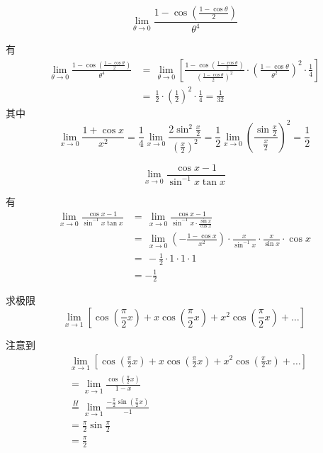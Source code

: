 \begin{questions}
    \question 
    \[
    \lim_{\theta \to 0} \frac{1 - \cos\left(\frac{1 - \cos \theta}{2}\right)}{\theta^4}
    \]
    \begin{solution}
        有
        \begin{align*}
        \lim_{\theta \to 0} \frac{1 - \cos\left(\frac{1 - \cos \theta}{2}\right)}{\theta^4} 
        &=\,\lim_{\theta \to 0} \left[
        \frac{1 - \cos\left(\frac{1 - \cos \theta}{2}\right)}{\left( \frac{1 - \cos \theta}{2} \right)^2}
        \cdot \left( \frac{1 - \cos \theta}{\theta^2} \right)^2 \cdot \frac{1}{4}
        \right] \\
        &=\,\frac{1}{2} \cdot \left(\frac{1}{2}\right)^2 \cdot \frac{1}{4} = \frac{1}{32}
        \end{align*}
        其中 \[
        \lim_{x \to 0} \frac{1+\cos x}{x^2}= \frac14\lim_{x \to 0}\frac{2\sin^2 \frac{x}{2} }{(\frac{x}{2})^2}=\frac12 \lim_{x \to 0} \left(\frac{\sin \frac{x}{2}}{\frac{x}{2}}\right)^2=\frac12
        \]
    \end{solution}
        
    \question 
    \[
    \lim_{x \to 0} \frac{\cos x - 1}{\sin^{-1} x \tan x}
    \]
    \begin{solution}
        有
        \begin{align*}
        \lim_{x \to 0} \frac{\cos x - 1}{\sin^{-1} x \tan x} 
        &=\,\lim_{x \to 0} \frac{\cos x - 1}{\sin^{-1} x \cdot \frac{\sin x}{\cos x}} \\
        &=\,\lim_{x \to 0} \left(-\frac{1 - \cos x}{x^2}\right) \cdot \frac{x}{\sin^{-1} x} \cdot \frac{x}{\sin x} \cdot \cos x \\
        &=\, -\frac{1}{2} \cdot 1 \cdot 1 \cdot 1 \\ 
        &= -\frac{1}{2}
        \end{align*}
    \end{solution}

    \question 求极限 
    \[
    \lim_{x \to 1} \left[ \cos\left(\frac{\pi}{2}x\right) + x\cos\left(\frac{\pi}{2}x\right) + x^2\cos\left(\frac{\pi}{2}x\right) + \dots \right]
    \]
    \begin{solution}
        注意到
        \begin{align*}
        &\lim_{x \to 1} \left[ \cos\left(\frac{\pi}{2}x\right) + x\cos\left(\frac{\pi}{2}x\right) + x^2\cos\left(\frac{\pi}{2}x\right) + \dots \right] \\
        &= \lim_{x \to 1}  \frac{\cos\left(\frac{\pi}{2}x\right)}{1-x} \\
        &\overset{H}{=} \lim_{x \to 1} \frac{-\frac{\pi}{2} \sin\left(\frac{\pi}{2}x\right)}{-1} \\
        &= \frac{\pi}{2} \sin\frac{\pi}{2} \\
        &= \frac{\pi}{2}
        \end{align*}
    \end{solution}


\end{questions}
